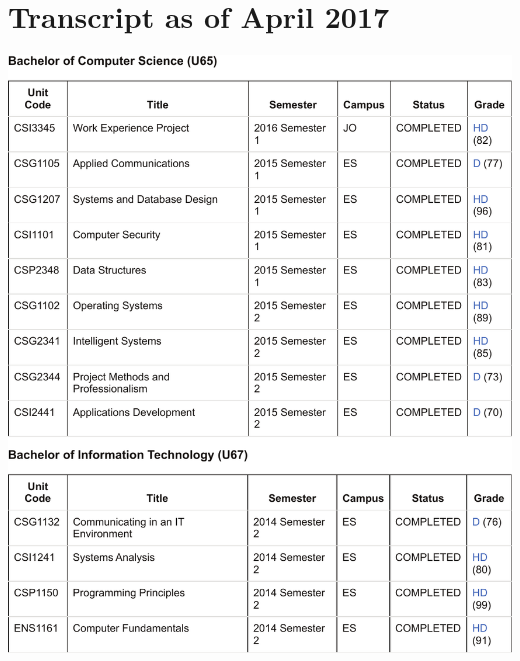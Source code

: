 \documentclass[10pt,a4paper,sans]{moderncv}        %
\begin{document}
\clearpage

\section{Transcript as of April 2017}

\vspace{2em}

\includegraphics[scale=.8]{./img/Transcript.pdf}
\end{document}
